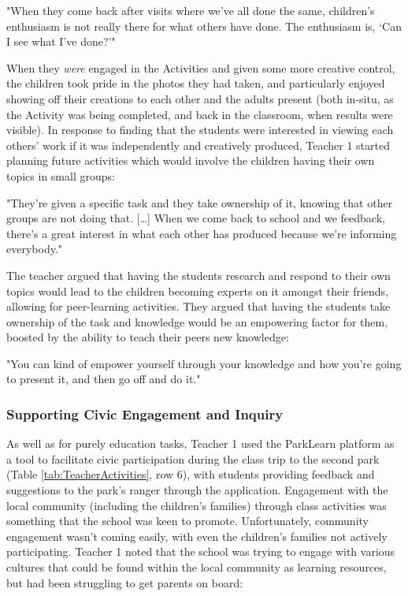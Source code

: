 \begin{displayquote}
"When they come back after visits where we've all done the same, children's enthusiasm is not really there for what others have done. The enthusiasm is, `Can I see what I've done?'"
\end{displayquote}

When they \textit{were} engaged in the Activities and given some more creative control, the children took pride in the photos they had taken, and particularly enjoyed showing off their creations to each other and the adults present (both in-situ, as the Activity was being completed, and back in the classroom, when results were visible). In response to finding that the students were interested in viewing each others' work if it was independently and creatively produced, Teacher 1 started planning future activities which would involve the children having their own topics in small groups: 

\begin{displayquote}
"They’re given a specific task and they take ownership of it, knowing that other groups are not doing that. […] When we come back to school and we feedback, there’s a great interest in what each other has produced because we’re informing everybody."
\end{displayquote}

The teacher argued that having the students research and respond to their own topics would lead to the children becoming experts on it amongst their friends, allowing for peer-learning activities. They argued that having the students take ownership of the task and knowledge would be an empowering factor for them, boosted by the ability to teach their peers new knowledge:

\begin{displayquote}
"You can kind of empower yourself through your knowledge and how you’re going to present it, and then go off and do it."
\end{displayquote}


\subsubsection{Supporting Civic Engagement and Inquiry}

As well as for purely education tasks, Teacher 1 used the ParkLearn platform as a tool to facilitate civic participation during the class trip to the second park (Table \ref{tab:TeacherActivities}, row 6), with students providing feedback and suggestions to the park's ranger through the application. Engagement with the local community (including the children's families) through class activities was something that the school was keen to promote. Unfortunately, community engagement wasn't coming easily, with even the children's families not actively participating. Teacher 1 noted that the school was trying to engage with various cultures that could be found within the local community as learning resources, but had been struggling to get parents on board: 

